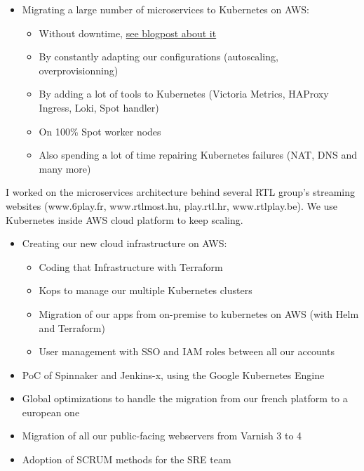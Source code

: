 \documentclass[12pt,a4paper,roman]{moderncv}          %
\begin{document}
{\begin{itemize}
  \item Migrating a large number of microservices to Kubernetes on AWS:
  \begin{itemize}
    \item Without downtime, \href{https://tech.bedrockstreaming.com/Migrating-production-apps-from-on-premise-to-the-cloud-with-no-downtime/}{\color{blue}see blogpost about it}
    \item By constantly adapting our configurations (autoscaling, overprovisionning)
    \item By adding a lot of tools to Kubernetes (Victoria Metrics, HAProxy Ingress, Loki, Spot handler)
    \item On 100\% Spot worker nodes
    \item Also spending a lot of time repairing Kubernetes failures (NAT, DNS and many more)
  \end{itemize}
\end{itemize}}


{I worked on the microservices architecture behind several RTL group's streaming websites (www.6play.fr, www.rtlmost.hu, play.rtl.hr, www.rtlplay.be). We use Kubernetes inside AWS cloud platform to keep scaling.
\begin{itemize}
  \item Creating our new cloud infrastructure on AWS:
  \begin{itemize}
    \item Coding that Infrastructure with Terraform
    \item Kops to manage our multiple Kubernetes clusters
    \item Migration of our apps from on-premise to kubernetes on AWS (with Helm and Terraform)
    \item User management with SSO and IAM roles between all our accounts
  \end{itemize}
  \item PoC of Spinnaker and Jenkins-x, using the Google Kubernetes Engine
  \item Global optimizations to handle the migration from our french platform to a european one
  \item Migration of all our public-facing webservers from Varnish 3 to 4
  \item Adoption of SCRUM methods for the SRE team
\end{itemize}}
\end{document}
